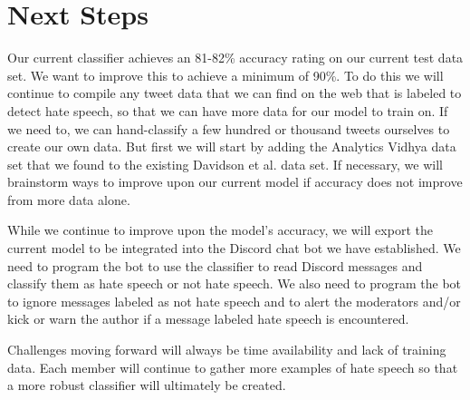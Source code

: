 \documentclass[conference]{sig-alternate-05-2015}
\begin{document}
\section{Next Steps}

Our current classifier achieves an 81-82\% accuracy rating on our current test data set. We want to improve this to achieve a minimum of 90\%. To do this we will continue to compile any tweet data that we can find on the web that is labeled to detect hate speech, so that we can have more data for our model to train on. If we need to, we can hand-classify a few hundred or thousand tweets ourselves to create our own data. But first we will start by adding the Analytics Vidhya data set that we found to the existing Davidson et al. data set.
If necessary, we will brainstorm ways to improve upon our current model if accuracy does not improve from more data alone.

While we continue to improve upon the model's accuracy, we will export the current model to be integrated into the Discord chat bot we have established. We need to program the bot to use the classifier to read Discord messages and classify them as hate speech or not hate speech. We also need to program the bot to ignore messages labeled as not hate speech and to alert the moderators and/or kick or warn the author if a message labeled hate speech is encountered.

Challenges moving forward will always be time availability and lack of training data.  Each member will continue to gather more examples of hate speech so that a more robust classifier will ultimately be created.  



\end{document}
